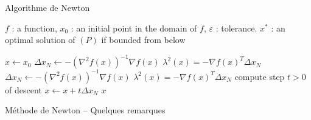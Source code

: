 \documentclass[aspectratio = 169]{beamer}
\begin{document}
\begin{frame}{Algorithme de Newton}
    \begin{algorithm}[H]
    \caption{Méthode de Newton}
    \small{
      \begin{algorithmic}[1]
        \Statex
        \Require $f$ : a function,  $x_0$ : an initial point in the domain of $f$, $\varepsilon$ : tolerance.
        \Ensure $x^*$ : an optimal solution of $(P)$ if bounded from below

        \State $x \leftarrow x_0$
        \State $\Delta x_N \leftarrow -\left(\nabla^2 f(x)\right)^{-1}\nabla f(x)$
        \State $\lambda^2(x) = -\nabla f(x)^T\Delta x_N$
        \State $\Delta x_N \leftarrow -\left(\nabla^2 f(x)\right)^{-1}\nabla f(x)$
        \State $\lambda^2(x) = -\nabla f(x)^T\Delta x_N$
        \State compute step $t > 0$ of descent
        \State $x \leftarrow x + t\Delta x_N$
        \EndWhile
        \State \Return $x$
        \EndFunction
        \Statex
      \end{algorithmic}
    }
  \end{algorithm}
\end{frame}

\begin{frame}{Méthode de Newton -- Quelques remarques}

\end{frame}
\end{document}
